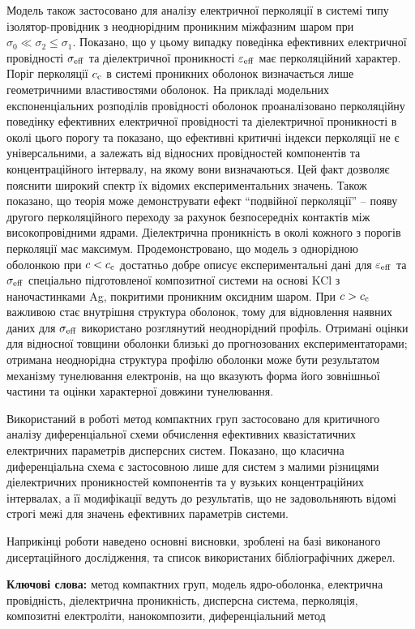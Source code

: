 Модель також застосовано для аналізу електричної перколяції в системі типу ізолятор-провідник з неоднорідним проникним міжфазним шаром при $\sigma_0 \ll \sigma_2 \leq \sigma_1$. Показано, що у цьому випадку поведінка
ефективних електричної провідності $\sigma_{\rm eff}$ та діелектричної проникності $\varepsilon_{\rm eff}$ має перколяційний характер.
Поріг перколяції $c_{\rm c}$ в системі проникних оболонок визначається лише геометричними властивостями оболонок. На прикладі модельних експоненціальних розподілів провідності оболонок проаналізовано перколяційну поведінку ефективних електричної провідності та діелектричної проникності в околі цього порогу та показано, що  ефективні  критичні індекси перколяції не є універсальними, а залежать від відносних провідностей компонентів та концентраційного інтервалу, на якому вони визначаються. Цей факт дозволяє пояснити широкий спектр їх відомих експериментальних значень. 
Також показано, що теорія може демонструвати ефект ``подвійної перколяції'' -- появу другого перколяційного переходу за рахунок безпосередніх контактів між високопровідними ядрами. Діелектрична проникність в околі кожного з порогів перколяції має максимум. 
Продемонстровано, що модель з однорідною оболонкою при $c<c_{\rm c}$ достатньо добре описує експериментальні дані для $\varepsilon_{\rm eff}$ та $\sigma_{\rm eff}$ спеціально підготовленої композитної системи на основі KCl
з наночастинками Ag, покритими проникним оксидним шаром. При $c>c_{\rm c}$ важливою стає внутрішня структура оболонок, тому для відновлення наявних даних для $\sigma_{\rm eff}$ використано розглянутий неоднорідний профіль. Отримані оцінки для відносної товщини оболонки близькі до прогнозованих експериментаторами; отримана неоднорідна структура профілю оболонки може бути результатом механізму тунелювання електронів, на що вказують форма його зовнішньої частини та оцінки характерної довжини тунелювання. 

Використаний в роботі метод компактних груп застосовано для критичного аналізу диференціальної схеми обчислення ефективних квазістатичних електричних параметрів дисперсних систем.  Показано, що класична диференціальна схема є застосовною лише для систем з малими різницями діелектричних проникностей компонентів та у вузьких концентраційних інтервалах, а її модифікації ведуть до результатів, що не задовольняють відомі строгі межі   для значень ефективних параметрів системи.

Наприкінці роботи наведено основні висновки, зроблені на базі виконаного дисертаційного дослідження, та список використаних бібліографічних джерел.

\vskip 15pt
\textbf{Ключові слова:} метод компактних груп, модель ядро-оболонка, електрична провідність, діелектрична проникність, дисперсна система, перколяція, композитні електроліти, нанокомпозити, диференціальний метод
